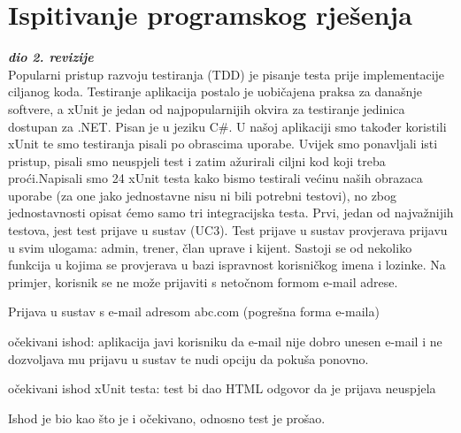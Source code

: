 			
			\eject 
		
	
		\section{Ispitivanje programskog rješenja}
			
			\textbf{\textit{dio 2. revizije}}\\
			
			 \textnormal{Popularni pristup razvoju testiranja (TDD) je pisanje testa prije implementacije ciljanog koda.  	Testiranje aplikacija postalo je uobičajena praksa za današnje softvere, a xUnit je jedan od najpopularnijih okvira za testiranje jedinica dostupan za .NET. Pisan je u jeziku C\#. U našoj aplikaciji smo također koristili xUnit te smo testiranja pisali po obrascima uporabe. Uvijek smo ponavljali isti pristup, pisali smo neuspjeli test i zatim ažurirali ciljni kod koji treba proći.Napisali smo 24 xUnit testa kako bismo testirali većinu naših obrazaca uporabe (za one jako jednostavne nisu ni bili potrebni testovi), no zbog jednostavnosti opisat ćemo samo tri integracijska testa.}
			 \bigbreak
			 \textnormal {	Prvi, jedan od najvažnijih testova, jest test prijave u sustav (UC3). Test prijave u sustav provjerava prijavu u svim ulogama: admin, trener, član uprave i kijent. Sastoji se od nekoliko funkcija u kojima se provjerava u bazi ispravnost korisničkog imena i lozinke. Na primjer, korisnik se ne može prijaviti s netočnom formom e-mail adrese. }
			 	\begin{packed_item}
			 	
			 	\item Prijava u sustav s e-mail adresom abc.com (pogrešna forma e-maila)
			 	\item[] \begin{packed_enum}
			 		\item očekivani ishod: aplikacija javi korisniku da e-mail nije dobro unesen e-mail i ne dozvoljava mu prijavu u sustav te nudi opciju da pokuša ponovno.
			 		\item očekivani ishod xUnit testa: test bi dao HTML odgovor da je prijava neuspjela
			 	\end{packed_enum}
			 \end{packed_item}
		 \textnormal {Ishod je bio kao što je i očekivano, odnosno test je prošao.}
		 
